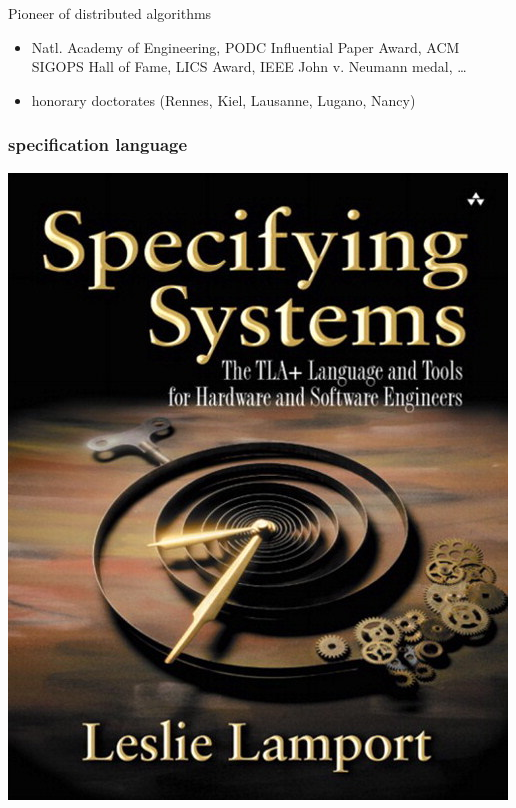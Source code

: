 \begin{frame}
\bigskip

  Pioneer of distributed algorithms

  \begin{small}
  \begin{itemize}
  \item Natl. Academy of Engineering,
    PODC Influential Paper Award, ACM SIGOPS Hall of Fame, LICS Award,
    IEEE John v. Neumann medal, \ldots
  \item honorary doctorates (Rennes, Kiel, Lausanne, Lugano, Nancy)
  \end{itemize}
  \end{small}
\end{frame}

\begin{frame}
  \frametitle{\tlaplus{} specification language}

  \begin{minipage}{0.27\linewidth}
    \includegraphics[width=\linewidth]{figs/tla-book-cover}
  \end{minipage}
  \hfill
  \begin{minipage}{.7\linewidth}
    \raggedright


\end{minipage}
\end{frame}
